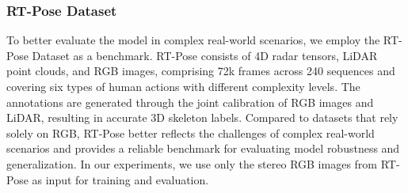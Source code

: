 \documentclass[journal]{IEEEtran}
\begin{document}
\subsubsection{RT-Pose Dataset}
To better evaluate the model in complex real-world scenarios, we employ the RT-Pose Dataset  as a benchmark. RT-Pose consists of 4D radar tensors, LiDAR point clouds, and RGB images, comprising 72k frames across 240 sequences and covering six types of human actions with different complexity levels. The annotations are generated through the joint calibration of RGB images and LiDAR, resulting in accurate 3D skeleton labels. Compared to datasets that rely solely on RGB, RT-Pose better reflects the challenges of complex real-world scenarios and provides a reliable benchmark for evaluating model robustness and generalization. In our experiments, we use only the stereo RGB images from RT-Pose as input for training and evaluation.
\end{document}
